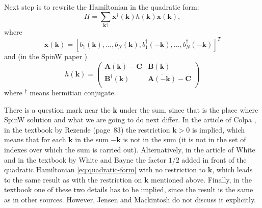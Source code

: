 \documentclass[a4paper,12pt]{article}
\begin{document}
        Next step is to rewrite the Hamiltonian in the quadratic form:
        \begin{equation}
            H = \sum_{\boldsymbol{k} ?} \boldsymbol{x}^{\dag}(\boldsymbol{k})h(\boldsymbol{k})\boldsymbol{x}(\boldsymbol{k}), \label{eq:quadratic-form}
        \end{equation}
        where
        \begin{equation}
            \boldsymbol{x}(\boldsymbol{k}) = \left[b_1(\boldsymbol{k}), \dots, b_N(\boldsymbol{k}), 
            b^{\dag}_1(-\boldsymbol{k}), \dots, b^{\dag}_N(-\boldsymbol{k})\right]^T
        \end{equation}
        and (in the SpinW paper \cite{toth2015linear})
        \begin{equation}
            h(\boldsymbol{k}) = 
            \begin{pmatrix}
                \boldsymbol{A}(\boldsymbol{k}) - \boldsymbol{C} & \boldsymbol{B}(\boldsymbol{k}) \\
                \boldsymbol{B}^{\dag}(\boldsymbol{k}) &\overline{\boldsymbol{A}(-\boldsymbol{k})} - \boldsymbol{C} \\
            \end{pmatrix} \label{eq:h-spinw}
        \end{equation}
        where $^{\dag}$ means hermitian conjugate.
        
        There is a question mark near the $\boldsymbol{k}$ under the sum, since that is the place where SpinW solution and what we are going to do next differ.
        In the article of Colpa \cite{colpa1978diagonalization}, in the textbook by Rezende \cite{rezende2020fundamentals} (page~$83$) 
        the restriction $\boldsymbol{k} > 0$ is implied, 
        which means that for each $\boldsymbol{k}$ in the sum $-\boldsymbol{k}$ is not in the sum (it is not in the set of indexes over which the sum is carried out). 
        Alternatively, in the article of White \cite{white1965diagonalization} and in the textbook by White and Bayne \cite{white1983quantum} 
        the factor $1/2$ added in front of the quadratic Hamiltonian \eqref{eq:quadratic-form} with no restriction to $\boldsymbol{k}$, 
        which leads to the same result as with the restriction on $\boldsymbol{k}$ mentioned above. 
        Finally, in the textbook \cite{jensen1991rare} one of these two details has to be implied, 
        since the result is the same as in other sources. However, Jensen and Mackintosh do not discuss it explicitly.
\end{document}
